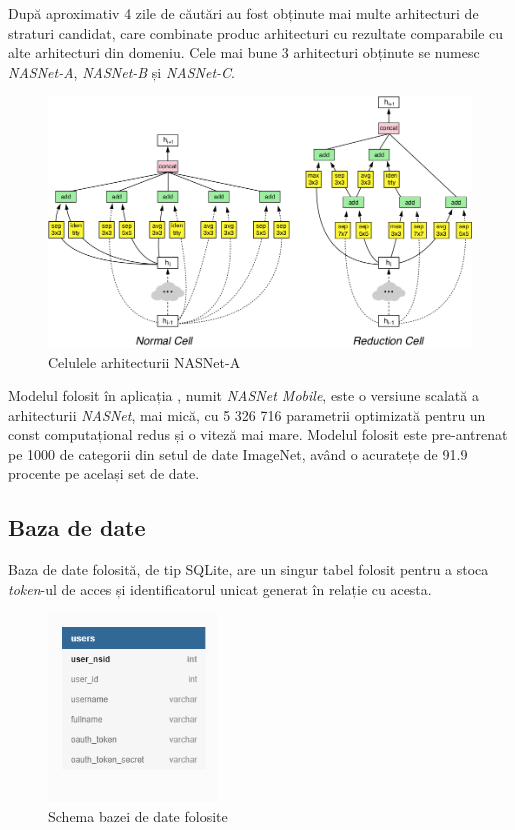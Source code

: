 După aproximativ 4 zile de căutări au fost obținute mai multe arhitecturi de straturi candidat, care combinate produc arhitecturi cu rezultate comparabile cu alte arhitecturi din domeniu. Cele mai bune 3 arhitecturi obținute se numesc \textit{NASNet-A}, \textit{NASNet-B} și \textit{NASNet-C}.

\begin{figure}[!htbp]
    \begin{center}
        \includegraphics[width=1.0\textwidth]{images/nasnetcells.png}
        \caption{Celulele arhitecturii NASNet-A \cite{DBLP:journals/corr/ZophVSL17}}
    \end{center}
\end{figure}

Modelul folosit în aplicația {\applicationtitle}, numit \textit{NASNet Mobile}, este o versiune scalată a arhitecturii \textit{NASNet}, mai mică, cu 5 326 716 parametrii optimizată pentru un const computațional redus și o viteză mai mare. Modelul folosit este pre-antrenat pe 1000 de categorii din setul de date ImageNet, având o acuratețe de 91.9 procente pe același set de date.

\subsection{Baza de date}
Baza de date folosită, de tip SQLite, are un singur tabel folosit pentru a stoca \textit{token}-ul de acces și identificatorul unicat generat în relație cu acesta.

\begin{figure}[!htbp]
    \begin{center}
        \includegraphics[width=0.4\textwidth]{images/database.png}
        \caption{Schema bazei de date folosite}
    \end{center}
\end{figure}